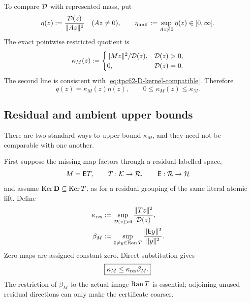 To compare \(\mathcal D\) with represented mass, put
\begin{equation}
 \eta(z):=\frac{\mathcal D(z)}{\|Az\|^2}
 \quad(Az\ne0),
 \qquad
 \eta_{\rm unif}:=\sup_{Az\ne0}\eta(z)\in[0,\infty].
 \label{eq:tpc62-eta-pointwise-uniform}
\end{equation}
The exact pointwise restricted quotient is
\begin{equation}
 \kappa_M(z):=
 \begin{cases}
 \|Mz\|^2/\mathcal D(z),&\mathcal D(z)>0,\\
 0,&\mathcal D(z)=0.
 \end{cases}
 \label{eq:tpc62-pointwise-kappa-definition}
\end{equation}
The second line is consistent with
\eqref{eq:tpc62-D-kernel-compatible}.  Therefore
\begin{equation}
 q(z)=\kappa_M(z)\eta(z),
 \qquad
 0\le\kappa_M(z)\le\kappa_M.
 \label{eq:tpc62-pointwise-factorization}
\end{equation}

\subsection{Residual and ambient upper bounds}

There are two standard ways to upper-bound \(\kappa_M\), and they need
not be comparable with one another.

First suppose the missing map factors through a residual-labelled space,
\begin{equation}
 M=\mathsf E T,
 \qquad
 T:\mathcal K\to\mathcal R,
 \qquad
 \mathsf E:\mathcal R\to\mathcal H
 \label{eq:tpc62-residual-factorization}
\end{equation}
and assume \(\operatorname{Ker}\mathbf D\subseteq\operatorname{Ker} T\), as for a residual grouping
of the same literal atomic lift.  Define
\begin{align}
 \kappa_{\rm res}
 &:=\sup_{\mathcal D(z)>0}\frac{\|Tz\|^2}{\mathcal D(z)},
 \label{eq:tpc62-kappa-res-definition}\\
 \beta_M
 &:=\sup_{0\ne y\in\operatorname{Ran} T}
       \frac{\|\mathsf Ey\|^2}{\|y\|^2}.
 \label{eq:tpc62-beta-definition}
\end{align}
Zero maps are assigned constant zero.  Direct substitution gives
\begin{equation}
 \boxed{\kappa_M\le\kappa_{\rm res}\beta_M.}
 \label{eq:tpc62-residual-product-bound}
\end{equation}
The restriction of \(\beta_M\) to the actual image \(\operatorname{Ran} T\) is
essential; adjoining unused residual directions can only make the
certificate coarser.

